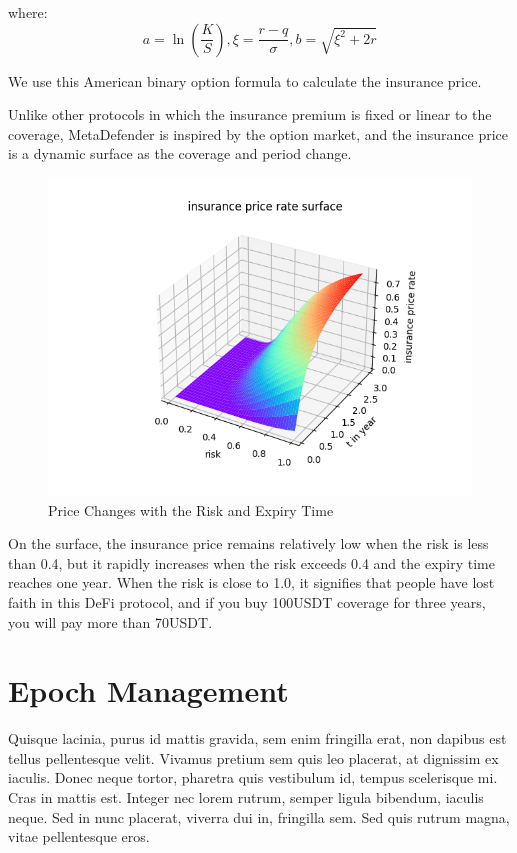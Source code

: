 \documentclass[10pt, a4paper, twocolumn]{article} %
\begin{document}
where:
\begin{equation}
	a = \ln(\frac{K}{S}), \xi = \frac{r-q}{\sigma}, b = \sqrt {\xi^2 + 2r}
\end{equation}

We use this American binary option formula to calculate the insurance price.

Unlike other protocols in which the insurance premium is fixed or linear to the coverage, MetaDefender is inspired by the option market, and the insurance price is a dynamic surface as the coverage and period change.

\begin{figure}[H]
	\includegraphics[width=\linewidth]{insurance_price_rate_surface} %
	\caption{Price Changes with the Risk and Expiry Time} %
	\label{surface} %
\end{figure}

On the surface, the insurance price remains relatively low when the risk is less than 0.4, but it rapidly increases when the risk exceeds 0.4 and the expiry time reaches one year.
When the risk is close to 1.0, it signifies that people have lost faith in this DeFi protocol, and if you buy 100USDT coverage for three years, you will pay more than 70USDT.

\section{Epoch Management}\label{sec:epoch-management}

Quisque lacinia, purus id mattis gravida, sem enim fringilla erat, non dapibus est tellus pellentesque velit. Vivamus pretium sem quis leo placerat, at dignissim ex iaculis. Donec neque tortor, pharetra quis vestibulum id, tempus scelerisque mi. Cras in mattis est. Integer nec lorem rutrum, semper ligula bibendum, iaculis neque. Sed in nunc placerat, viverra dui in, fringilla sem. Sed quis rutrum magna, vitae pellentesque eros.
\end{document}
